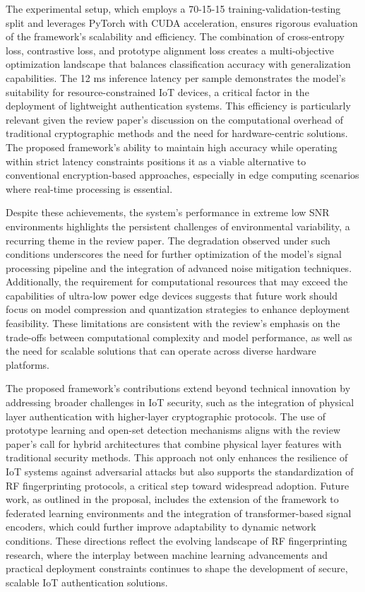 \documentclass[conference]{IEEEtran}
\begin{document}
The experimental setup, which employs a 70-15-15 training-validation-testing split and leverages PyTorch with CUDA acceleration, ensures rigorous evaluation of the framework's scalability and efficiency. The combination of cross-entropy loss, contrastive loss, and prototype alignment loss creates a multi-objective optimization landscape that balances classification accuracy with generalization capabilities. The 12 ms inference latency per sample demonstrates the model's suitability for resource-constrained IoT devices, a critical factor in the deployment of lightweight authentication systems. This efficiency is particularly relevant given the review paper's discussion on the computational overhead of traditional cryptographic methods and the need for hardware-centric solutions. The proposed framework's ability to maintain high accuracy while operating within strict latency constraints positions it as a viable alternative to conventional encryption-based approaches, especially in edge computing scenarios where real-time processing is essential.  

Despite these achievements, the system's performance in extreme low SNR environments highlights the persistent challenges of environmental variability, a recurring theme in the review paper. The degradation observed under such conditions underscores the need for further optimization of the model's signal processing pipeline and the integration of advanced noise mitigation techniques. Additionally, the requirement for computational resources that may exceed the capabilities of ultra-low power edge devices suggests that future work should focus on model compression and quantization strategies to enhance deployment feasibility. These limitations are consistent with the review's emphasis on the trade-offs between computational complexity and model performance, as well as the need for scalable solutions that can operate across diverse hardware platforms.  

The proposed framework's contributions extend beyond technical innovation by addressing broader challenges in IoT security, such as the integration of physical layer authentication with higher-layer cryptographic protocols. The use of prototype learning and open-set detection mechanisms aligns with the review paper's call for hybrid architectures that combine physical layer features with traditional security methods. This approach not only enhances the resilience of IoT systems against adversarial attacks but also supports the standardization of RF fingerprinting protocols, a critical step toward widespread adoption. Future work, as outlined in the proposal, includes the extension of the framework to federated learning environments and the integration of transformer-based signal encoders, which could further improve adaptability to dynamic network conditions. These directions reflect the evolving landscape of RF fingerprinting research, where the interplay between machine learning advancements and practical deployment constraints continues to shape the development of secure, scalable IoT authentication solutions.  
\end{document}
